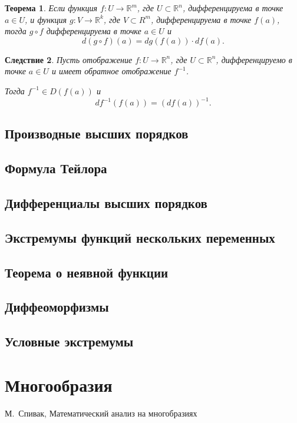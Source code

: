 \documentclass[oneside, final]{book}
\newcommand{\mbb}[1]{\mathbb{#1}}
\theoremstyle{plain}
\newtheorem{theorem}{Теорема}[chapter]
\newtheorem{corollary}[theorem]{Следствие}
\theoremstyle{definition}
\begin{document}
	\begin{theorem}
		Если функция $f\colon U \to \mbb R^m$, где $U \subset \mbb R^n$, дифференцируема в точке $a\in U$, и функция $g \colon V \to \mbb R^k$, где $V \subset R^m$, дифференцируема в точке $f(a)$, тогда
		$g \circ f$ дифференцируема в точке $a \in U$ и 
		$$
			d(g \circ f)(a) = dg(f(a))\cdot df(a).
		$$
	\end{theorem}
	\begin{corollary}
		Пусть отображение $f\colon U \to \mbb R^n$, где $U \subset \mbb R^n$, дифференцируемо в точке $a\in U$ и  имеет обратное отображение $f^{-1}$.
		
		Тогда $f^{-1} \in D(f(a))$ и 
		$$
			df^{-1}(f(a)) = (df(a))^{-1}.
		$$
	\end{corollary}
	
	
	\section{Производные высших порядков}
	
	\section{Формула Тейлора}

	\section{Дифференциалы высших порядков}
	
	\section{Экстремумы функций нескольких переменных}
	
	\section{Теорема о неявной функции}
	
	\section{Диффеоморфизмы}
	
	\section{Условные экстремумы} 
		
	\chapter{Многообразия}
	
	\begin{thebibliography}{0}
		 М.~Спивак, Математический анализ на многобразиях
	\end{thebibliography}
\end{document}
